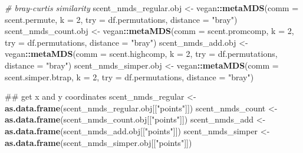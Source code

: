 \documentclass[]{article}
\newenvironment{Shaded}{\begin{snugshade}}{\end{snugshade}}
\newcommand{\KeywordTok}[1]{\textcolor[rgb]{0.13,0.29,0.53}{\textbf{#1}}}
\newcommand{\DataTypeTok}[1]{\textcolor[rgb]{0.13,0.29,0.53}{#1}}
\newcommand{\DecValTok}[1]{\textcolor[rgb]{0.00,0.00,0.81}{#1}}
\newcommand{\StringTok}[1]{\textcolor[rgb]{0.31,0.60,0.02}{#1}}
\newcommand{\CommentTok}[1]{\textcolor[rgb]{0.56,0.35,0.01}{\textit{#1}}}
\newcommand{\OperatorTok}[1]{\textcolor[rgb]{0.81,0.36,0.00}{\textbf{#1}}}
\newcommand{\NormalTok}[1]{#1}
\begin{document}
\begin{Shaded}
\begin{Highlighting}[]
{{{{{        \CommentTok{# bray-curtis similarity}
\NormalTok{        scent_nmds_regular.obj <-}\StringTok{ }\NormalTok{vegan}\OperatorTok{::}\KeywordTok{metaMDS}\NormalTok{(}\DataTypeTok{comm =}\NormalTok{ scent.permute, }
            \DataTypeTok{k =} \DecValTok{2}\NormalTok{, }\DataTypeTok{try =}\NormalTok{ df.permutations, }
            \DataTypeTok{distance =} \StringTok{"bray"}\NormalTok{)}
\NormalTok{        scent_nmds_count.obj <-}\StringTok{ }\NormalTok{vegan}\OperatorTok{::}\KeywordTok{metaMDS}\NormalTok{(}\DataTypeTok{comm =}\NormalTok{ scent.promcomp, }
            \DataTypeTok{k =} \DecValTok{2}\NormalTok{, }\DataTypeTok{try =}\NormalTok{ df.permutations, }
            \DataTypeTok{distance =} \StringTok{"bray"}\NormalTok{)}
\NormalTok{        scent_nmds_add.obj <-}\StringTok{ }\NormalTok{vegan}\OperatorTok{::}\KeywordTok{metaMDS}\NormalTok{(}\DataTypeTok{comm =}\NormalTok{ scent.highcomp, }
            \DataTypeTok{k =} \DecValTok{2}\NormalTok{, }\DataTypeTok{try =}\NormalTok{ df.permutations, }
            \DataTypeTok{distance =} \StringTok{"bray"}\NormalTok{)}
\NormalTok{        scent_nmds_simper.obj <-}\StringTok{ }\NormalTok{vegan}\OperatorTok{::}\KeywordTok{metaMDS}\NormalTok{(}\DataTypeTok{comm =}\NormalTok{ scent.simper.btrap, }
            \DataTypeTok{k =} \DecValTok{2}\NormalTok{, }\DataTypeTok{try =}\NormalTok{ df.permutations, }
            \DataTypeTok{distance =} \StringTok{"bray"}\NormalTok{)}
        
\NormalTok{        ## get x and y coordinates}
\NormalTok{        scent_nmds_regular <-}\StringTok{ }\KeywordTok{as.data.frame}\NormalTok{(scent_nmds_regular.obj[[}\StringTok{"points"}\NormalTok{]])}
\NormalTok{        scent_nmds_count <-}\StringTok{ }\KeywordTok{as.data.frame}\NormalTok{(scent_nmds_count.obj[[}\StringTok{"points"}\NormalTok{]])}
\NormalTok{        scent_nmds_add <-}\StringTok{ }\KeywordTok{as.data.frame}\NormalTok{(scent_nmds_add.obj[[}\StringTok{"points"}\NormalTok{]])}
\NormalTok{        scent_nmds_simper <-}\StringTok{ }\KeywordTok{as.data.frame}\NormalTok{(scent_nmds_simper.obj[[}\StringTok{"points"}\NormalTok{]])}
        
}}}}}
\end{Highlighting}
\end{Shaded}
\end{document}
